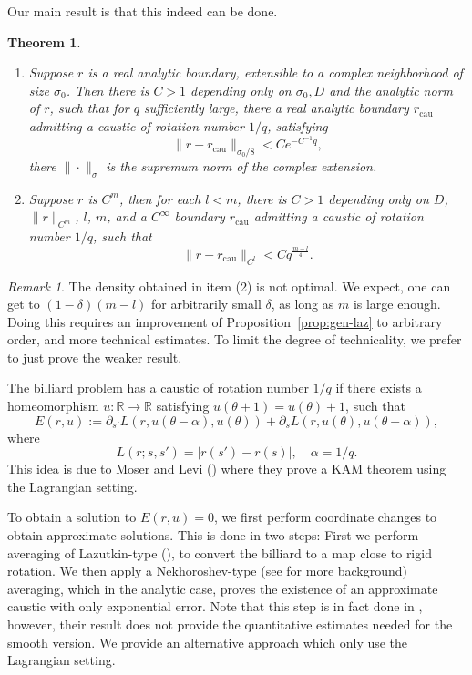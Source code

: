 \documentclass[12pt,reqno]{amsart}
\newtheorem{thm}{Theorem}[section]
\theoremstyle{remark}
\newtheorem*{rmk}{Remark}
\begin{document}
Our main result is that this indeed can be done. 
\begin{thm}\label{thm:main}
\begin{enumerate}
 \item  Suppose $r$ is a real analytic boundary, extensible to a complex neighborhood of size $\sigma_0$.  Then there is $C>1$ depending only on $\sigma_0, D$ and the analytic norm of $r$, such that for $q$ sufficiently large, there a real analytic boundary $r_{\mathrm{cau}}$ admitting a caustic of rotation number $1/q$, satisfying 
 \[
 	\|r - r_{\mathrm{cau}}\|_{\sigma_0/8} < C e^{- C^{-1} q},
 \] 
 there $\|\cdot\|_{\sigma}$ is the supremum norm of the complex extension. 
 \item Suppose $r$ is $C^m$, then for each $l < m$,  there is $C > 1$ depending only on $D$, $\|r\|_{C^m}$, $l$, $m$, and a $C^\infty$ boundary $r_{\mathrm{cau}}$ admitting a caustic of rotation number $1/q$, such that 
 \[
 	\|r - r_{\mathrm{cau}}\|_{C^l} < C q^{\frac{m-l}{4}}. 
 \]
\end{enumerate}
\end{thm}
\begin{rmk}
The density obtained in item (2) is not optimal. We expect, one can get to $(1-\delta)(m-l)$ for arbitrarily small $\delta$, as long as $m$ is large enough. Doing this requires an improvement of Proposition~\ref{prop:gen-laz} to arbitrary order, and more technical estimates. To limit the degree of technicality, we prefer to just prove the weaker result. 
\end{rmk}

The billiard problem has a caustic of rotation number $1/q$ if there exists a homeomorphism $u: {\mathbb{R}} \to {\mathbb{R}}$ satisfying $u(\theta +1) = u(\theta) + 1$, such that 
\begin{equation}
	\label{eq:inv-cur}
	E(r, u) := \partial_{s'} L(r, u(\theta - \alpha), u(\theta)) + \partial_s L(r, u(\theta), u(\theta + \alpha)), 
\end{equation}
where 
\[
	L(r; s, s') = |r(s') - r(s)|, \quad  \alpha = 1/q.
\]
This idea is due to Moser and Levi (\cite{LM2001}) where they prove a KAM theorem using the Lagrangian setting. 

To obtain a solution to $E(r, u) = 0$, we first perform coordinate changes to obtain approximate solutions. This is done in two steps: First we perform averaging of Lazutkin-type (\cite{Laz1973}), to convert the billiard to a map close to rigid rotation. We then apply a Nekhoroshev-type (see \cite{LN1992} for more background) averaging, which in the analytic case, proves the existence of an approximate caustic with only exponential error. Note that this step is in fact done in \cite{MRT2016}, however, their result does not provide the quantitative estimates needed for the smooth version. We provide an alternative approach which only use the Lagrangian setting. 
\end{document}
